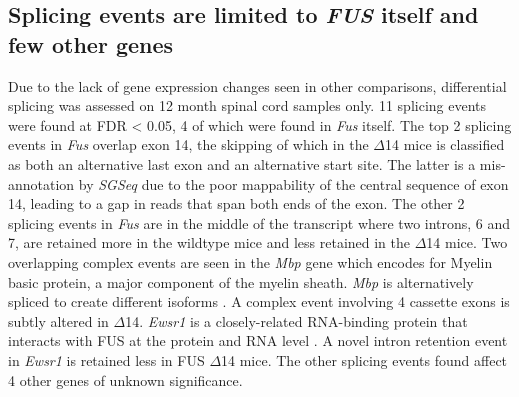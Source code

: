 \subsection{Splicing events are limited to \textit{FUS} itself and few other genes}
Due to the lack of gene expression changes seen in other comparisons, differential splicing was assessed on 12 month spinal cord samples only.  
11 splicing events were found at FDR < 0.05, 4 of which were found in \textit{Fus} itself.
The top 2 splicing events in \textit{Fus} overlap exon 14, the skipping of which in the $\Delta$14 mice is classified as both an alternative last exon and an alternative start site.
The latter is a mis-annotation by \textit{SGSeq} due to the poor mappability of the central sequence of exon 14, leading to a gap in reads that span both ends of the exon.
The other 2 splicing events in \textit{Fus} are in the middle of the transcript where two introns, 6 and 7, are retained more in the wildtype mice and less retained in the $\Delta$14 mice.
Two overlapping complex events are seen in the \textit{Mbp} gene which encodes for Myelin basic protein, a major component of the myelin sheath. \textit{Mbp} is alternatively spliced to create different isoforms \citep{DeFerra1985}. A complex event involving 4 cassette exons is subtly altered in $\Delta$14.
\textit{Ewsr1} is a closely-related RNA-binding protein that interacts with FUS at the protein and RNA level \citep{Kapeli2016,Lagier-Tourenne2012}. 
A novel intron retention event in \textit{Ewsr1} is retained less in FUS $\Delta$14 mice.
The other splicing events found affect 4 other genes of unknown significance.

